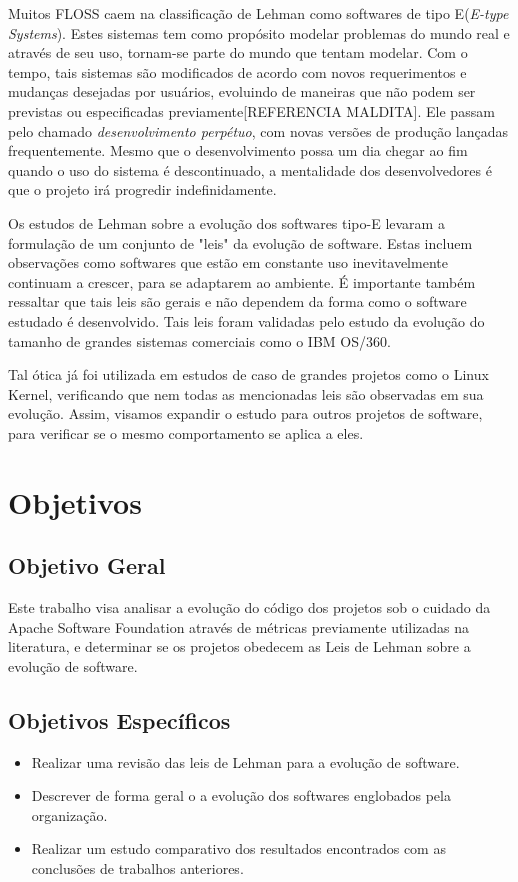 Muitos FLOSS caem na classificação de Lehman como softwares de tipo E\cite{}(\textit{E-type Systems}). Estes sistemas tem como propósito modelar problemas do mundo real e através de seu uso, tornam-se parte do mundo que tentam modelar. Com o tempo, tais sistemas são modificados de acordo com novos requerimentos e mudanças desejadas por usuários, evoluindo de maneiras que não podem ser previstas ou especificadas previamente[REFERENCIA MALDITA]. Ele passam pelo chamado \textit{desenvolvimento perpétuo}, com novas versões de produção lançadas frequentemente. Mesmo que o desenvolvimento possa um dia chegar ao fim quando o uso do sistema é descontinuado, a mentalidade dos desenvolvedores é que o projeto irá progredir indefinidamente.

Os estudos de Lehman sobre a evolução dos softwares tipo-E levaram a formulação de um conjunto de "leis" da evolução de software. Estas incluem observações como softwares que estão em constante uso inevitavelmente continuam a crescer, para se adaptarem ao ambiente. É importante também ressaltar que tais leis são gerais e não dependem da forma como o software estudado é desenvolvido. Tais leis foram validadas pelo estudo da evolução do tamanho de grandes sistemas comerciais como o IBM OS/360. 

Tal ótica já foi utilizada em estudos de caso de grandes projetos como o Linux Kernel\cite{israeli2010linux}, verificando que nem todas as mencionadas leis são observadas em sua evolução. Assim, visamos expandir o estudo para outros projetos de software, para verificar se o mesmo comportamento se aplica a eles.


\section{Objetivos}
\subsection{Objetivo Geral}
Este trabalho visa analisar a evolução do código dos projetos sob o cuidado da Apache Software Foundation através de métricas previamente utilizadas na literatura, e determinar se os projetos obedecem as Leis de Lehman sobre a evolução de software.

\subsection{Objetivos Específicos}
\begin{itemize}
\item Realizar uma revisão das leis de Lehman para a evolução de software.
\item Descrever de forma geral o a evolução dos softwares englobados pela organização.
\item Realizar um estudo comparativo dos resultados encontrados com as conclusões de trabalhos anteriores.
\end{itemize}


